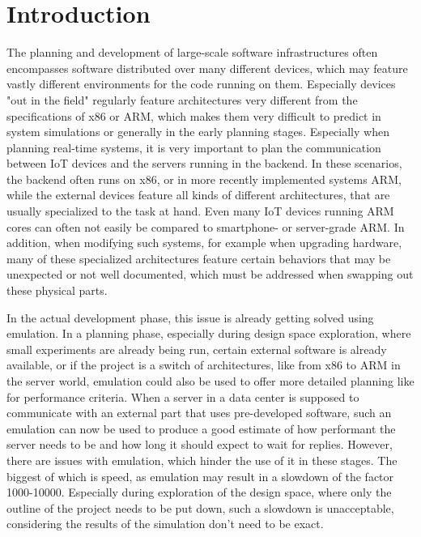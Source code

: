 
\chapter{Introduction}\label{chap:introduction}
The planning and development of large-scale software infrastructures often encompasses software distributed over many different devices,
which may feature vastly different environments for the code running on them.
Especially devices "out in the field" regularly feature architectures very different from the specifications of x86 or ARM,
which makes them very difficult to predict in system simulations or generally in the early planning stages.
Especially when planning real-time systems,
it is very important to plan the communication between IoT devices and the servers running in the backend.
In these scenarios, the backend often runs on x86, or in more recently implemented systems ARM,
while the external devices feature all kinds of different architectures,
that are usually specialized to the task at hand.
Even many IoT devices running ARM cores can often not easily be compared to smartphone- or server-grade ARM.
In addition, when modifying such systems, for example when upgrading hardware,
many of these specialized architectures feature certain behaviors that may be unexpected or not well documented,
which must be addressed when swapping out these physical parts.

In the actual development phase, this issue is already getting solved using emulation.
In a planning phase, especially during design space exploration, where small experiments are already being run,
certain external software is already available, or if the project is a switch of architectures,
like from x86 to ARM in the server world,
emulation could also be used to offer more detailed planning
like for performance criteria.
When a server in a data center is supposed to communicate with an external part that uses pre-developed software,
such an emulation can now be used to produce a good estimate of how performant the server needs to be and how long it should expect to wait for replies.
However, there are issues with emulation, which hinder the use of it in these stages.
The biggest of which is speed, as emulation may result in a slowdown of the factor 1000-10000\cite{slowdown}.
Especially during exploration of the design space, where only the outline of the project needs to be put down,
such a slowdown is unacceptable, considering the results of the simulation don't need to be exact.

